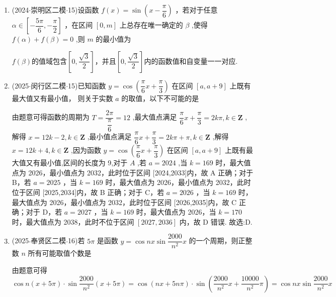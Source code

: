 \begin{enumerate}
\begin{jieda}
        \ps 绘制振动图像即可.
    \end{jieda}
    \item (2024$\cdot$崇明区二模$\cdot$15)设函数 $f\left( x\right)  = \sin \left( {x - \dfrac{\pi }{6}}\right)$ ，若对于任意 $\alpha  \in  \left\lbrack  {-\dfrac{5\pi }{6}, - \dfrac{\pi }{2}}\right\rbrack$ ，在区间 $\left\lbrack  {0,m}\right\rbrack$ 上总存在唯一确定的 $\beta$ ,使得 $f\left( \alpha \right)  + f\left( \beta \right)  = 0$ ,则 $m$ 的最小值为 
    \begin{jieda}
        $f(\beta)$的值域包含$\left[0, \dfrac{\sqrt{3}}{2}\right]$，并且$\left[0, \dfrac{\sqrt{3}}{2}\right]$内的函数值和自变量一一对应.
    \end{jieda}
    \item (2025$\cdot$闵行区二模$\cdot$15)已知函数 $y = \cos \left( {\dfrac{\pi }{6}x + \dfrac{\pi }{3}}\right)$ 在区间 $\left\lbrack  {a,a + 9}\right\rbrack$ 上既有最大值又有最小值， 则关于实数 $a$ 的取值，以下不可能的是 
    \begin{jieda}
        由题意可得函数的周期为 $T = \dfrac{2\pi }{\dfrac{\pi }{6}} = {12}$ ,最大值点满足 $\dfrac{\pi }{6}x + \dfrac{\pi }{3} = {2k\pi },k \in  \mathbf{Z}$ ,解得 $x = {12k} - 2,k \in  \mathbf{Z}$ ,最小值点满足 $\dfrac{\pi }{6}x + \dfrac{\pi }{3} = {2k\pi } + \pi ,k \in  \mathbf{Z}$ ,解得 $x = {12k} + 4,k \in  \mathbf{Z}$ ,因为函数 $y = \cos \left( {\dfrac{\pi }{6}x + \dfrac{\pi }{3}}\right)$ 在区间 $\left\lbrack  {a,a + 9}\right\rbrack$ 上既有最大值又有最小值,区间的长度为 9,对于 ${A}$ ,若 $a = {2024}$ ,当 $k = {169}$ 时，最大值点为 2026，最小值点为 2032，此时位于区间 [2024,2033]内，故 A 正确；对于 B，若 $a = {2025}$ ，当 $k = {169}$ 时，最大值点为 2026，最小值点为 2032，此时位于区间 [2025,2034]内，故 B 正确；对于 C，若 $a = {2026}$ ，当 $k = {169}$ 时，最大值点为 2026，最小值点为 2032，此时位于区间 [2026,2035]内，故 C 正确；对于 D，若 $a = {2027}$ ，当 $k = {169}$ 时，最大值点为 2026，当 $k = {170}$ 时，最大值点为 2038，此时不位于区间 $\left\lbrack  {{2027},{2036}}\right\rbrack$ 内，故 D 错误. 故选:D.
    \end{jieda}
    \item (2025$\cdot$奉贤区二模$\cdot$16)若 ${5\pi }$ 是函数 $y = \cos {nx}\sin \dfrac{2000}{{n}^{2}}x$ 的一个周期，则正整数 $n$ 所有可能取值个数是 
    \begin{jieda}
        由题意可得 $\cos n\left( {x + {5\pi }}\right)  \cdot  \sin \dfrac{2000}{{n}^{2}}\left( {x + {5\pi }}\right)  =  \cos \left( {{nx} + {5n\pi }}\right)  \cdot  \sin \left( {\dfrac{2000}{{n}^{2}}x + \dfrac{10000}{{n}^{2}}\pi }\right)  = \cos {nx}\sin \dfrac{2000}{{n}^{2}}x$

\end{jieda}
\end{enumerate}

